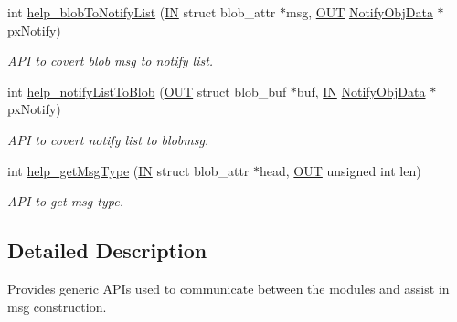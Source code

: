 \begin{DoxyCompactItemize}
int \hyperlink{group__LIBHELP_ga586354ddaf797ab49619492959d24970}{help\-\_\-blob\-To\-Notify\-List} (\hyperlink{group__LIBHELP_gac2bbd6d630a06a980d9a92ddb9a49928}{I\-N} struct blob\-\_\-attr $\ast$msg, \hyperlink{group__LIBHELP_gaec78e7a9e90a406a56f859ee456e8eae}{O\-U\-T} \hyperlink{structNotifyObjData}{Notify\-Obj\-Data} $\ast$px\-Notify)
\begin{DoxyCompactList}\small\item\em A\-P\-I to covert blob msg to notify list. \end{DoxyCompactList}\item 
int \hyperlink{group__LIBHELP_gab966addd9ba1b125401c02a4c29cdf7b}{help\-\_\-notify\-List\-To\-Blob} (\hyperlink{group__LIBHELP_gaec78e7a9e90a406a56f859ee456e8eae}{O\-U\-T} struct blob\-\_\-buf $\ast$buf, \hyperlink{group__LIBHELP_gac2bbd6d630a06a980d9a92ddb9a49928}{I\-N} \hyperlink{structNotifyObjData}{Notify\-Obj\-Data} $\ast$px\-Notify)
\begin{DoxyCompactList}\small\item\em A\-P\-I to covert notify list to blobmsg. \end{DoxyCompactList}\item 
int \hyperlink{group__LIBHELP_gaaad2bd9ad957d8d3c4a28932f377ec1e}{help\-\_\-get\-Msg\-Type} (\hyperlink{group__LIBHELP_gac2bbd6d630a06a980d9a92ddb9a49928}{I\-N} struct blob\-\_\-attr $\ast$head, \hyperlink{group__LIBHELP_gaec78e7a9e90a406a56f859ee456e8eae}{O\-U\-T} unsigned int len)
\begin{DoxyCompactList}\small\item\em A\-P\-I to get msg type. \end{DoxyCompactList}\end{DoxyCompactItemize}


\subsection{Detailed Description}
Provides generic A\-P\-Is used to communicate between the modules and assist in msg construction. 


